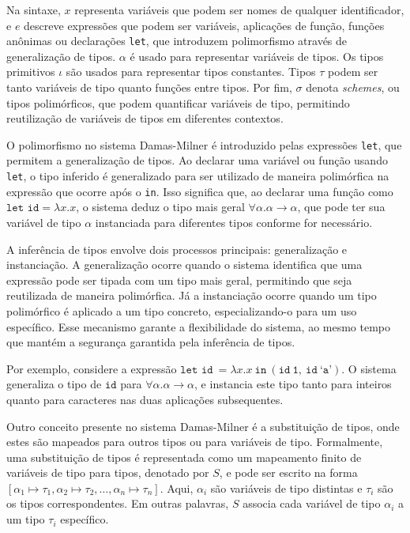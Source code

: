 Na sintaxe, $x$ representa variáveis que podem ser nomes de qualquer identificador, e $e$ descreve expressões que podem ser variáveis, aplicações de função, funções anônimas ou declarações \texttt{let}, que introduzem polimorfismo através de generalização de tipos.
$\alpha$ é usado para representar variáveis de tipos.
Os tipos primitivos $\iota$ são usados para representar tipos constantes.
Tipos $\tau$ podem ser tanto variáveis de tipo quanto funções entre tipos.
Por fim, $\sigma$ denota \textit{schemes}, ou tipos polimórficos, que podem quantificar variáveis de tipo, permitindo reutilização de variáveis de tipos em diferentes contextos.

O polimorfismo no sistema Damas-Milner é introduzido pelas expressões \texttt{let}, que permitem a generalização de tipos.
Ao declarar uma variável ou função usando \texttt{let}, o tipo inferido é generalizado para ser utilizado de maneira polimórfica na expressão que ocorre após o \texttt{in}.
Isso significa que, ao declarar uma função como $\texttt{let id} = \lambda x.x$, o sistema deduz o tipo mais geral $\forall \alpha. \alpha \rightarrow \alpha$, que pode ter sua variável de tipo $\alpha$ instanciada para diferentes tipos conforme for necessário.

A inferência de tipos envolve dois processos principais: generalização e instanciação.
A generalização ocorre quando o sistema identifica que uma expressão pode ser tipada com um tipo mais geral, permitindo que seja reutilizada de maneira polimórfica.
Já a instanciação ocorre quando um tipo polimórfico é aplicado a um tipo concreto, especializando-o para um uso específico.
Esse mecanismo garante a flexibilidade do sistema, ao mesmo tempo que mantém a segurança garantida pela inferência de tipos.

Por exemplo, considere a expressão $\texttt{let id} \ = \lambda x.x \ \texttt{in} \ (\texttt{id} \ \texttt{1}, \ \texttt{id} \ \texttt{`a'})$.
O sistema generaliza o tipo de $\texttt{id}$ para $\forall \alpha. \alpha \rightarrow \alpha$, e instancia este tipo tanto para inteiros quanto para caracteres nas duas aplicações subsequentes.

Outro conceito presente no sistema Damas-Milner é a substituição de tipos, onde estes são mapeados para outros tipos ou para variáveis de tipo.
Formalmente, uma substituição de tipos é representada como um mapeamento finito de variáveis de tipo para tipos, denotado por $S$, e pode ser escrito na forma $[ \alpha_1 \mapsto \tau_1, \alpha_2 \mapsto \tau_2, \ldots, \alpha_n \mapsto \tau_n ]$.
Aqui, $\alpha_i$ são variáveis de tipo distintas e $\tau_i$ são os tipos correspondentes.
Em outras palavras, $S$ associa cada variável de tipo $\alpha_i$ a um tipo $\tau_i$ específico.

